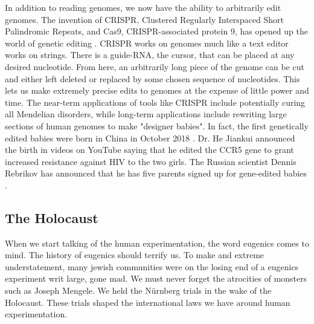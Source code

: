 In addition to reading genomes, we now have the ability to arbitrarily edit genomes.
The invention of CRISPR, Clustered Regularly Interspaced Short Palindromic Repeats, and Cas9, CRISPR-associated protein 9, has opened up the world of genetic editing \cite{Zhang2014}.
CRISPR works on genomes much like a text editor works on strings.
There is a guide-RNA, the cursor, that can be placed at any desired nucleotide.
From here, an arbitrarily long piece of the genome can be cut and either left deleted or replaced by some chosen sequence of nucleotides.
This lets us make extremely precise edits to genomes at the expense of little power and time.
The near-term applications of tools like CRISPR include potentially curing all Mendelian disorders, while long-term applications include rewriting large sections of human genomes to make "designer babies".
In fact, the first genetically edited babies were born in China in October 2018 \cite{crisprbabies2018}.
Dr. He Jiankui announced the birth in videos on YouTube saying that he edited the CCR5 gene to grant increased resistance against HIV to the two girls.
The Russian scientist Dennis Rebrikov has announced that he has five parents signed up for gene-edited babies \cite{Cohen2019}.

\subsection{The Holocaust}

When we start talking of the human experimentation, the word eugenics comes to mind.
The history of eugenics should terrify us.
To make and extreme understatement, many jewish communities were on the losing end of a eugenics experiment writ large, gone mad.
We must never forget the atrocities of monsters such as Joseph Mengele.
We held the N\"urnberg trials in the wake of the Holocaust.
These trials shaped the international laws we have around human experimentation.

